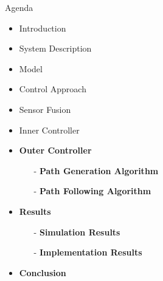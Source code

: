 \begin{frame}{Agenda}{}
    \begin{itemize}
        \item Introduction
        \item System Description
        \item Model
        \item Control Approach
        \item Sensor Fusion
        \item Inner Controller
        \item \textbf{Outer Controller}
        \begin{itemize}
            \item[-] \textbf{Path Generation Algorithm}
            \item[-] \textbf{Path Following Algorithm}
        \end{itemize}
        \item \textbf{Results}
        \begin{itemize}
            \item[-] \textbf{Simulation Results}
            \item[-] \textbf{Implementation Results}
        \end{itemize}
        \item \textbf{Conclusion}
    \end{itemize}
\end{frame}
